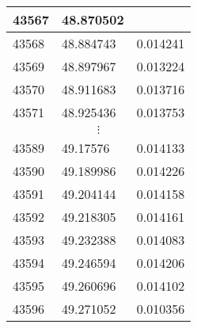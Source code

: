 \documentclass[a4paper,9pt]{beamer}
\begin{document}
{\begin{table}[htbp]
\begin{minipage}{0.4\linewidth}
\begin{tabular}{|l|l|l|}
\hline  
43567&48.870502&\\
\hline 
43568&48.884743&0.014241\\
\hline 
43569&48.897967&0.013224\\
\hline 
43570&48.911683&0.013716\\
\hline 
43571&48.925436&0.013753\\
\hline 
\multicolumn{3}{|c|}{$\vdots$} \\
\hline
43589&49.17576&0.014133\\
\hline
43590&49.189986&0.014226\\
\hline
43591&49.204144&0.014158\\
\hline
43592&49.218305&0.014161\\
\hline
43593&49.232388&0.014083\\
\hline
43594&49.246594&0.014206\\
\hline
43595&49.260696&0.014102\\
\hline
43596&49.271052&0.010356\\
\hline
  \end{tabular}
  \end{minipage}
\end{table}

}
\end{document}
